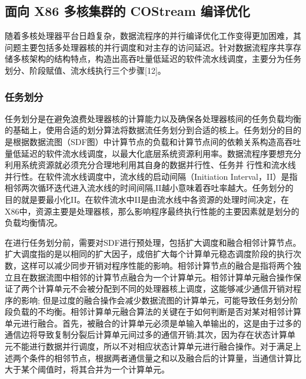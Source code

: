 \subsection{面向 X86 多核集群的 COStream 编译优化} \label{section:x86}

随着多核处理器平台日趋复杂，数据流程序的并行编译优化工作变得更加困难，其问题主要包括多处理器核的并行调度和对主存的访问延迟。针对数据流程序共享存储多核架构的结构特点，构造出高吞吐量低延迟的软件流水线调度，主要分为任务划分、阶段赋值、流水线执行三个步骤[12]。

\subsubsection{任务划分}

任务划分是在避免浪费处理器核的计算能力以及确保各处理器核间的任务负载均衡的基础上，使用合适的划分算法将数据流任务划分到合适的核上。任务划分的目的是根据数据流图（SDF图）中计算节点的负载和计算节点间的依赖关系构造高吞吐量低延迟的软件流水线调度，以最大化底层系统资源利用率。数据流程序要想充分利用系统资源就必须充分合理地利用其自身的数据并行性、任务并 行性和流水线并行性。在软件流水线调度中，流水线的启动间隔（Initiation Interval，II）是指相邻两次循环迭代进入流水线的时间间隔,II越小意味着吞吐率越大。任务划分的目的就是要最小化II。在软件流水中II是由流水线中各资源的处理时间决定，在X86中，资源主要是处理器核，那么影响程序最终执行性能的主要因素就是划分的负载均衡情况。

在进行任务划分前，需要对SDF进行预处理，包括扩大调度和融合相邻计算节点。扩大调度指的是以相同的扩大因子，成倍扩大每个计算单元稳态调度阶段的执行次数，这样可以减少同步开销对程序性能的影响。相邻计算节点的融合是指将两个独立且在数据流图中相邻的计算节点融合为一个计算单元。相邻计算单元融合操作保证了两个计算单元不会被分配到不同的处理器核上调度，这能够减少通信开销对程序的影响; 但是过度的融合操作会减少数据流图的计算单元，可能导致任务划分阶段负载的不均衡。相邻计算单元融合算法的关键在于如何判断是否对某对相邻计算单元进行融合。首先，被融合的计算单元必须是单输入单输出的，这是由于过多的通信边将导致复制分裂后计算单元间过多的通信开销;其次，因为存在状态计算单元不能进行数据并行调度，所以不对相应状态计算单元进行融合操作。对于满足上述两个条件的相邻节点，根据两者通信量之和以及融合后的计算量，当通信计算比大于某个阈值时，将其合并为一个计算单元。

